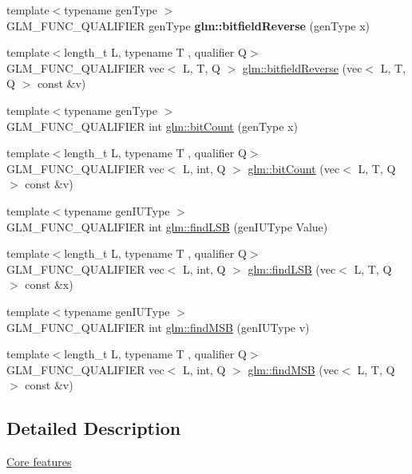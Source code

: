 \begin{DoxyCompactItemize}
{\footnotesize template$<$typename gen\+Type $>$ }\\G\+L\+M\+\_\+\+F\+U\+N\+C\+\_\+\+Q\+U\+A\+L\+I\+F\+I\+ER gen\+Type {\bfseries glm\+::bitfield\+Reverse} (gen\+Type x)
\item 
{\footnotesize template$<$length\+\_\+t L, typename T , qualifier Q$>$ }\\G\+L\+M\+\_\+\+F\+U\+N\+C\+\_\+\+Q\+U\+A\+L\+I\+F\+I\+ER vec$<$ L, T, Q $>$ \hyperlink{group__core__func__integer_ga750a1d92464489b7711dee67aa3441b6}{glm\+::bitfield\+Reverse} (vec$<$ L, T, Q $>$ const \&v)
\item 
{\footnotesize template$<$typename gen\+Type $>$ }\\G\+L\+M\+\_\+\+F\+U\+N\+C\+\_\+\+Q\+U\+A\+L\+I\+F\+I\+ER int \hyperlink{group__core__func__integer_ga44abfe3379e11cbd29425a843420d0d6}{glm\+::bit\+Count} (gen\+Type x)
\item 
{\footnotesize template$<$length\+\_\+t L, typename T , qualifier Q$>$ }\\G\+L\+M\+\_\+\+F\+U\+N\+C\+\_\+\+Q\+U\+A\+L\+I\+F\+I\+ER vec$<$ L, int, Q $>$ \hyperlink{group__core__func__integer_gaac7b15e40bdea8d9aa4c4cb34049f7b5}{glm\+::bit\+Count} (vec$<$ L, T, Q $>$ const \&v)
\item 
{\footnotesize template$<$typename gen\+I\+U\+Type $>$ }\\G\+L\+M\+\_\+\+F\+U\+N\+C\+\_\+\+Q\+U\+A\+L\+I\+F\+I\+ER int \hyperlink{group__core__func__integer_gaf74c4d969fa34ab8acb9d390f5ca5274}{glm\+::find\+L\+SB} (gen\+I\+U\+Type Value)
\item 
{\footnotesize template$<$length\+\_\+t L, typename T , qualifier Q$>$ }\\G\+L\+M\+\_\+\+F\+U\+N\+C\+\_\+\+Q\+U\+A\+L\+I\+F\+I\+ER vec$<$ L, int, Q $>$ \hyperlink{group__core__func__integer_ga4454c0331d6369888c28ab677f4810c7}{glm\+::find\+L\+SB} (vec$<$ L, T, Q $>$ const \&x)
\item 
{\footnotesize template$<$typename gen\+I\+U\+Type $>$ }\\G\+L\+M\+\_\+\+F\+U\+N\+C\+\_\+\+Q\+U\+A\+L\+I\+F\+I\+ER int \hyperlink{group__core__func__integer_ga7e4a794d766861c70bc961630f8ef621}{glm\+::find\+M\+SB} (gen\+I\+U\+Type v)
\item 
{\footnotesize template$<$length\+\_\+t L, typename T , qualifier Q$>$ }\\G\+L\+M\+\_\+\+F\+U\+N\+C\+\_\+\+Q\+U\+A\+L\+I\+F\+I\+ER vec$<$ L, int, Q $>$ \hyperlink{group__core__func__integer_ga39ac4d52028bb6ab08db5ad6562c2872}{glm\+::find\+M\+SB} (vec$<$ L, T, Q $>$ const \&v)
\end{DoxyCompactItemize}


\subsection{Detailed Description}
\hyperlink{group__core}{Core features} 